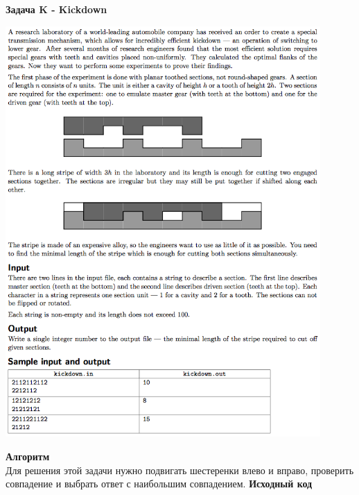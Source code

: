 \documentclass[a4paper,12pt]{article}
\begin{document}
\newpage
\textbf{{\large Задача K - Kickdown}} \\
\begin{center}
\includegraphics[width=0.9\textwidth]{CT_S02E09/CT_S02E09_K.png}\\ [1cm]
\end{center}
\textbf{{\large Алгоритм}} \\
Для решения этой задачи нужно подвигать шестеренки влево и вправо, проверить совпадение и выбрать ответ с наибольшим совпадением.
\newpage
\textbf{{\large Исходный код}} \\
\end{document}
